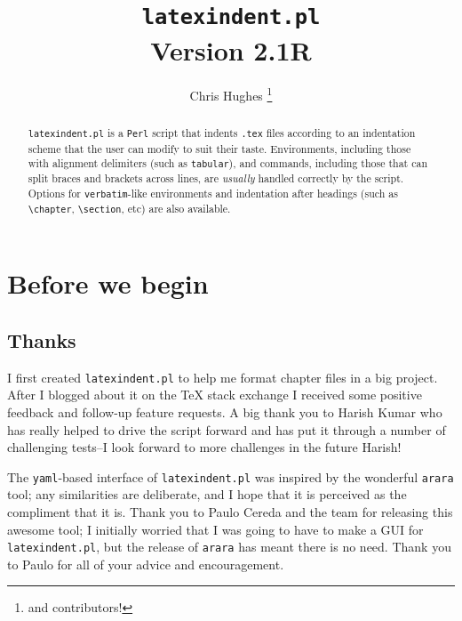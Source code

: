 \documentclass[11pt]{article}
\begin{document}
	\title{\lstinline[basicstyle=\huge\ttfamily]!latexindent.pl!\\[1cm]
		Version 2.1R}
\author{Chris Hughes \footnote{and contributors!}}
\maketitle
\begin{abstract}
	\lstinline!latexindent.pl! is a \lstinline!Perl! script that indents \lstinline!.tex!
	files according to an indentation scheme that the user can modify to suit their
	taste. Environments, including those with alignment delimiters (such as \lstinline!tabular!),
	and commands, including those that can split braces and brackets across lines,
	are \emph{usually} handled correctly by the script. Options for \lstinline!verbatim!-like
	environments and indentation after headings (such as \lstinline!\chapter!, \lstinline!\section!, etc)
	are also available.
\end{abstract}

\tableofcontents
\lstlistoflistings

\section{Before we begin}
\subsection{Thanks}
I first created \lstinline!latexindent.pl! to help me format chapter files
in a big project. After I blogged about it on the
\TeX{} stack exchange \cite{cmhblog} I received some positive feedback and
follow-up feature requests. A big thank you to Harish Kumar who has really
helped to drive the script forward and has put it through a number of challenging
tests--I look forward to more challenges in the future Harish!

The \lstinline!yaml!-based interface of \lstinline!latexindent.pl! was inspired
by the wonderful \lstinline!arara! tool; any similarities are deliberate, and
I hope that it is perceived as the compliment that it is. Thank you to Paulo Cereda and the
team for releasing this awesome tool; I initially worried that I was going to
have to make a GUI for \lstinline!latexindent.pl!, but the release of \lstinline!arara!
has meant there is no need. Thank you to Paulo for all of your advice and
encouragement.
\end{document}
